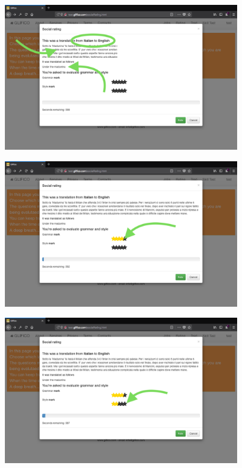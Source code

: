 \documentclass[11 pt, a4paper]{article}
\begin{document}
\begin{figure}[H]
\centering
\includegraphics[width=0.9\textwidth]{translator_socialrating3.png}
\end{figure}


\clearpage
\begin{figure}[H]
\centering
\includegraphics[width=0.9\textwidth]{translator_socialrating4.png}
\end{figure}


\begin{figure}[H]
\centering
\includegraphics[width=0.9\textwidth]{translator_socialrating5.png}
\end{figure}
\end{document}
